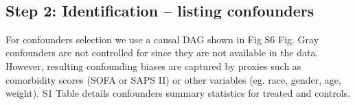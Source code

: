 \documentclass[10pt,letterpaper]{article}
\begin{document}
\begin{table}[h!]
  \centering\small
  \\[.5ex]
  \caption{\textbf{Characteristics of the trial population measured on the first 24
      hours of ICU stay.}\\ S1 Table
    describes all confounders used in the analysis.}\label{table:albumin_for_sepsis:table1_simple}
\end{table}


\subsection*{Step 2: Identification -- listing confounders}\label{sec:identification_mimic_iv}

For confounders selection we use a causal DAG shown in Fig
S6 Fig. Gray confounders are not controlled for since
they are not available in the data. However, resulting confounding biases are
captured by proxies such as comorbidity scores (SOFA or SAPS II) or other
variables (eg. race, gender, age, weight).
%
S1 Table details confounders
summary statistics for treated and controls.
\end{document}
